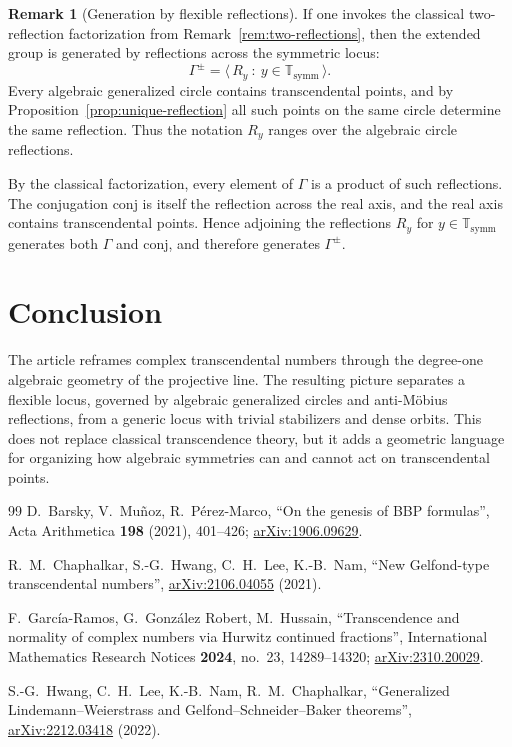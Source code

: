 \documentclass[11pt,a4paper]{article}
\theoremstyle{plain}
\theoremstyle{definition}
\newtheorem{remark}[theorem]{Remark}
\newcommand{\trans}{\mathbb{T}}
\newcommand{\Tc}{\trans}
\newcommand{\ssymm}{\Tc_{\mathrm{symm}}}
\newcommand{\J}{\mathrm{conj}}
\begin{document}
\begin{remark}[Generation by flexible reflections]\label{rem:gen-by-reflections}
	If one invokes the classical two-reflection factorization from Remark~\ref{rem:two-reflections}, then the extended group is generated by reflections across the symmetric locus:
	\[
		\Gamma^{\pm}=\langle\, R_y\ :\ y\in\ssymm\,\rangle.
	\]
	Every algebraic generalized circle contains transcendental points, and by Proposition~\ref{prop:unique-reflection} all such points on the same circle determine the same reflection. Thus the notation $R_y$ ranges over the algebraic circle reflections.
	
	By the classical factorization, every element of $\Gamma$ is a product of such reflections. The conjugation $\J$ is itself the reflection across the real axis, and the real axis contains transcendental points. Hence adjoining the reflections $R_y$ for $y\in\ssymm$ generates both $\Gamma$ and $\J$, and therefore generates $\Gamma^{\pm}$.
\end{remark}

\section{Conclusion}

The article reframes complex transcendental numbers through the degree-one
algebraic geometry of the projective line. The resulting picture separates a
flexible locus, governed by algebraic generalized circles and anti-Möbius
reflections, from a generic locus with trivial stabilizers and dense orbits.
This does not replace classical transcendence theory, but it adds a geometric
language for organizing how algebraic symmetries can and cannot act on
transcendental points.

\begin{thebibliography}{99}
	D.\ Barsky, V.\ Mu\~noz, R.\ P\'erez-Marco,
	\newblock ``On the genesis of BBP formulas'',
	\newblock Acta Arithmetica \textbf{198} (2021), 401--426; \href{https://arxiv.org/abs/1906.09629}{arXiv:1906.09629}.

	R.\ M.\ Chaphalkar, S.-G.\ Hwang, C.\ H.\ Lee, K.-B.\ Nam,
	\newblock ``New Gelfond-type transcendental numbers'',
	\newblock \href{https://arxiv.org/abs/2106.04055}{arXiv:2106.04055} (2021).

	F.\ Garc\'ia-Ramos, G.\ Gonz\'alez Robert, M.\ Hussain,
	\newblock ``Transcendence and normality of complex numbers via Hurwitz continued fractions'',
	\newblock International Mathematics Research Notices \textbf{2024}, no.\ 23, 14289--14320; \href{https://arxiv.org/abs/2310.20029}{arXiv:2310.20029}.

	S.-G.\ Hwang, C.\ H.\ Lee, K.-B.\ Nam, R.\ M.\ Chaphalkar,
	\newblock ``Generalized Lindemann--Weierstrass and Gelfond--Schneider--Baker theorems'',
	\newblock \href{https://arxiv.org/abs/2212.03418}{arXiv:2212.03418} (2022).
\end{thebibliography}
\end{document}
